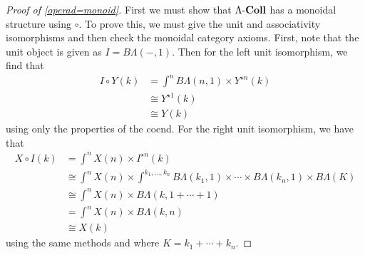 \begin{proof}[Proof of \cref{operad=monoid}]
First we must show that $\Lambda\mbox{-}\mathbf{Coll}$ has a monoidal structure using $\circ$. To prove this, we must give the unit and associativity isomorphisms and then check the monoidal category axioms. First, note that the unit object is given as $I = B\Lambda(-,1)$. Then for the left unit isomorphism, we find that
  \begin{align*}
    I \circ Y (k) &= \int^{n} B\Lambda(n,1) \times Y^{\star n}(k) \\
    &\cong Y^{\star 1}(k) \\
    &\cong Y(k)
  \end{align*}
using only the properties of the coend. For the right unit isomorphism, we have that
  \begin{align*}
    X \circ I (k) &= \int^{n} X(n) \times I^{\star n}(k) \\
    &\cong \int^{n} X(n) \times \int^{k_{1}, \ldots, k_{n}} B\Lambda(k_{1},1) \times \cdots \times B\Lambda(k_{n},1) \times B\Lambda(K) \\
    &\cong \int^{n} X(n) \times B\Lambda(k,1+ \cdots +1) \\
    &= \int^{n} X(n) \times B\Lambda(k,n) \\
    &\cong X(k)
  \end{align*}
using the same methods and where $K = k_1 + \cdots + k_n$.


\end{proof}
